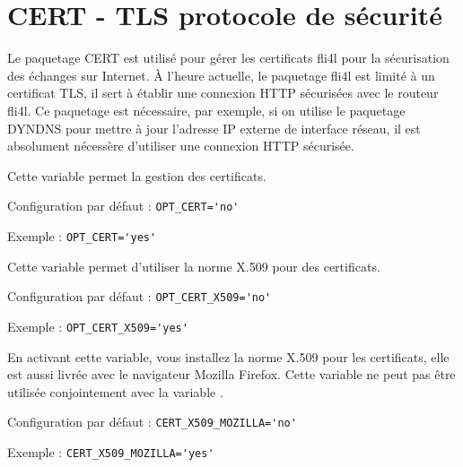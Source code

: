 
{
\section{CERT - TLS protocole de sécurité}
}

    Le paquetage CERT est utilisé pour gérer les certificats fli4l pour la sécurisation
	des échanges sur Internet. À l'heure actuelle, le paquetage fli4l est limité à un
	certificat TLS, il sert à établir une connexion HTTP sécurisées avec le routeur fli4l.
	Ce paquetage est nécessaire, par exemple, si on utilise le paquetage DYNDNS pour mettre
	à jour l'adresse IP externe de interface réseau, il est absolument nécessère d'utiliser
	une connexion HTTP sécurisée.

\begin{description}


    Cette variable permet la gestion des certificats.

    Configuration par défaut : \verb+OPT_CERT='no'+

    Exemple : \verb+OPT_CERT='yes'+


    Cette variable permet d'utiliser la norme X.509 pour des certificats.


    Configuration par défaut : \verb+OPT_CERT_X509='no'+

    Exemple : \verb+OPT_CERT_X509='yes'+


    En activant cette variable, vous installez la norme X.509 pour les certificats,
	elle est aussi livrée avec le navigateur Mozilla Firefox. Cette variable
	ne peut pas être utilisée conjointement avec la variable .

    Configuration par défaut : \verb+CERT_X509_MOZILLA='no'+

    Exemple : \verb+CERT_X509_MOZILLA='yes'+

\end{description}
